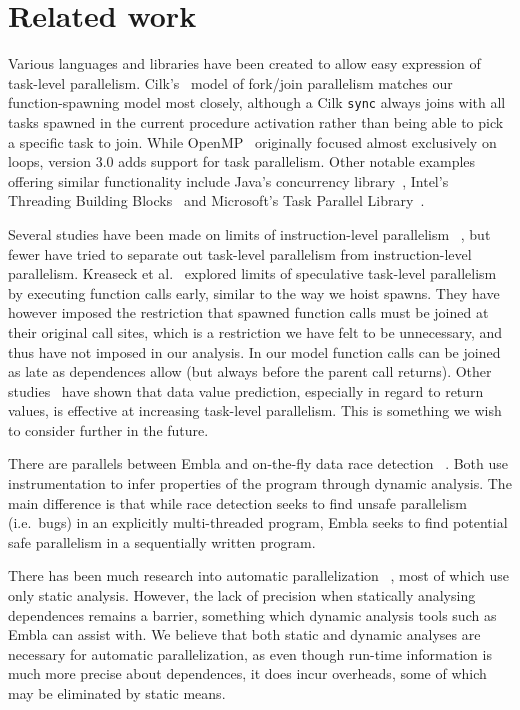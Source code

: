 \section{Related work}

Various languages and libraries have been created to allow easy
expression of task-level parallelism.  Cilk's~\cite{blumofe96cilk}
model of fork/join parallelism matches our function-spawning model
most closely, although a Cilk {\tt sync} always joins with all tasks 
spawned in the current procedure activation rather than being able to 
pick a specific task to join. While OpenMP~\cite{dagum98openmp} 
originally focused almost exclusively on loops, version 3.0 adds 
support for task parallelism.  Other notable examples
offering similar functionality 
include Java's concurrency library~\cite{lea00java}, Intel's
Threading Building Blocks~\cite{reinders07intel} and Microsoft's
Task Parallel Library~\cite{leijen07parallel}.

Several studies have been made on limits of instruction-level parallelism~
\cite{wall91limits,postiff99limits,austin92dynamic,lam92limits,mak09limits},
but fewer have tried to separate out task-level
parallelism from instruction-level parallelism.  Kreaseck et al.\
 explored limits of speculative task-level
parallelism by executing function calls early, similar to the
way we hoist spawns.  They have however imposed the restriction that
spawned function calls must be joined at their original call sites,
which is a restriction we have felt to be unnecessary, and thus have
not imposed in our analysis.  In our model function calls can be
joined as late as dependences allow (but always before the parent
call returns).  Other studies~\cite{warg01limits,oplinger99insearch}
have shown that data value prediction, especially in regard to return
values, is effective at increasing task-level parallelism.  This is
something we wish to consider further in the future.

There are parallels between Embla and on-the-fly data race detection~
\cite{MellorCrummey91onthefly,ha02space,savage97eraser}.  Both use
instrumentation to infer properties of the program through dynamic
analysis.  The main difference is that while race detection seeks to
find unsafe parallelism (i.e.\ bugs) in an explicitly multi-threaded
program, Embla seeks to find potential safe parallelism in a
sequentially written program.

There has been much research into automatic parallelization~
\cite{kennedy02optimizing,Blume94polaris,ottoni05automatic,ottoni07global},
most of which use only static analysis.  However,
the lack of precision when statically analysing dependences remains a
barrier, something which dynamic analysis tools such as Embla can assist
with.  We believe that both static and dynamic analyses are necessary
for automatic parallelization, as even though run-time information is
much more precise about dependences, it does incur overheads, some of
which may be eliminated by static means.

